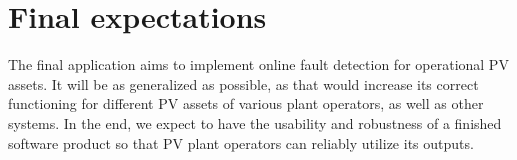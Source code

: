 
\section{Final expectations}

The final application aims to implement online fault detection for operational PV assets. It will be as generalized as possible, as that would increase its correct functioning for different PV assets of various plant operators, as well as other systems. In the end, we expect to have the usability and robustness of a finished software product so that PV plant operators can reliably utilize its outputs.


